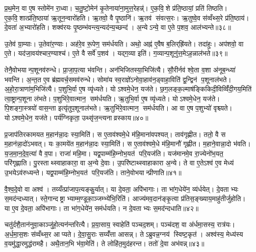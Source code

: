 प्र॒थ॒मेन॒ वा ए॒ष स्तोमे॑न रा॒ध्वा। च॒तु॒ष्टो॒मेन॑ कृ॒तेनाया॑ना॒मुत्त॒रेहन्न्॑। ए॒क॒वि॒शे प्र॑ति॒ष्ठायां॒ प्रति॑ तिष्ठति। ए॒क॒वि॒शात्प्र॑ति॒ष्ठाया॑ ऋ॒तून॒न्वारो॑हति। ऋ॒तवो॒ वै पृ॒ष्ठानि॑। ऋ॒तव॑ संवत्स॒रः। ऋ॒तुष्वे॒व स॑व्वँथ्स॒रे प्र॑ति॒ष्ठाय॑। दे॒वता॑ अ॒भ्यारो॑हति। शक्व॑रयः पृ॒ष्ठम्भ॑वन्त्य॒न्यद॑न्य॒च्छन्द॑। अ॒न्येऽन्ये॒ वा ए॒ते प॒शव॒ आल॑भ्यन्ते॥३८॥

उ॒तेव॑ ग्रा॒म्याः। उ॒तेवा॑र॒ण्याः। अह॑रे॒व रू॒पेण॒ सम॑र्धयति। अथो॒ अह्न॑ ए॒वैष ब॒लिर्‌ह्रि॑यते। तदा॑हुः। अप॑शवो॒ वा ए॒ते। यद॑जा॒वय॑श्चार॒ण्याश्च॑। ए॒ते वै सर्वे॑ प॒शव॑। यद्ग॒व्या इति॑। ग॒व्यान्प॒शूनु॑त्त॒मेऽह॒न्नाल॑भते॥३९॥

तेनै॒वोभयान्प॒शूनव॑रुन्धे। प्रा॒जा॒प॒त्या भ॑वन्ति। अन॑भिजितस्या॒भिजि॑त्यै। सौ॒रीर्नव॑ श्वे॒ता व॒शा अ॑नूब॒न्ध्या॑ भवन्ति। अ॒न्त॒त ए॒व ब्र॑ह्मवर्च॒समव॑रुन्धे। सोमा॑य स्व॒राज्ञे॑ऽनोवा॒हाव॑न॒ड्वाहा॒विति॑ द्व॒न्द्विन॑ प॒शूनाल॑भते। अ॒हो॒रा॒त्राणा॑म॒भिजि॑त्यै। प॒शुभि॒र्वा ए॒ष व्यृ॑ध्यते। योऽश्वमे॒धेन॒ यज॑ते। छ॒ग॒लङ्क॒ल्माष॑ङ्किकिदी॒विव्विँ॑दी॒गय॒मिति॑ त्वा॒ष्ट्रान्प॒शूना ल॑भते। प॒शुभि॑रे॒वात्मान॒ सम॑र्धयति। ऋ॒तुभि॒र्वा ए॒ष व्यृ॑ध्यते। योऽश्वमे॒धेन॒ यज॑ते। पि॒शङ्गा॒स्त्रयो॑ वास॒न्ता इत्यृ॑तुप॒शूनाल॑भते। ऋ॒तुभि॑रे॒वात्मान॒ सम॑र्धयति। आ वा ए॒ष प॒शुभ्यो॑ वृश्च्यते। योऽश्वमे॒धेन॒ यज॑ते। पर्य॑ग्निकृता॒ उथ्सृ॑ज॒न्त्यनाव्रस्काय॥४०॥\anuvakamend[ल॒भ्य॒न्ते॒ ल॒भ॒ते॒ त्वा॒ष्ट्रान्प॒शूनाल॑भते॒ऽष्टौ च॑]

प्र॒जाप॑तिरकामयत म॒हान॑न्ना॒दः स्या॒मिति॑। स ए॒ताव॑श्वमे॒धे म॑हि॒माना॑वपश्यत्। ताव॑गृह्णीत। ततो॒ वै स म॒हान॑न्ना॒दो॑ऽभवत्। यः का॒मये॑त म॒हान॑न्ना॒दः स्या॒मिति॑। स ए॒ताव॑श्वमे॒धे म॑हि॒मानौ॑ गृह्णीत। म॒हाने॒वान्ना॒दो भ॑वति। य॒ज॒मा॒न॒दे॒व॒त्या॑ वै व॒पा। राजा॑ महि॒मा। यद्व॒पाम्म॑हि॒म्नोभ॒यत॑ परि॒यज॑ति। यज॑मानमे॒व रा॒ज्येनो॑भ॒यत॒ परि॑गृह्णाति। पु॒रस्ताथ्स्वाहाकारा॒ वा अ॒न्ये दे॒वाः। उ॒परि॑ष्टाथ्स्वाहाकारा अ॒न्ये। ते वा ए॒तेऽश्व॑ ए॒व मेध्य॑ उ॒भयेऽव॑रुध्यन्ते। यद्व॒पाम्म॑हि॒म्नोभ॒यत॑ परि॒यज॑ति। ताने॒वोभयान्प्रीणाति॥४१॥\anuvakamend[प॒रि॒यज॑ति॒ षट्च॑]

वै॒श्व॒दे॒वो वा अश्व॑। तय्यँत्प्रा॑जाप॒त्यङ्कु॒र्यात्। या दे॒वता॒ अपि॑भागाः। ता भा॑ग॒धेये॑न॒ व्य॑र्धयेत्। दे॒वताभ्यः स॒मद॑न्दध्यात्। स्ते॒गान्दष्ट्राभ्याम्म॒ण्डूका॒ञ्जम्भ्ये॑भि॒रिति॑। आज्य॑मव॒दान॑ङ्कृ॒त्वा प्र॑तिस॒ङ्ख्याय॒माहु॑तीर्जुहोति। या ए॒व दे॒वता॒ अपि॑भागाः। ता भा॑ग॒धेये॑न॒ सम॑र्धयति। न दे॒वताभ्यः स॒मद॑न्दधाति॥४२॥

चतु॑र्दशै॒तान॑नुवा॒काञ्जु॑हो॒त्यन॑न्तरित्यै। प्र॒या॒साय॒ स्वाहेति॑ पञ्चद॒शम्। पञ्च॑दश॒ वा अ॑र्धमा॒सस्य॒ रात्र॑यः। अ॒र्ध॒मा॒स॒शः स॑व्वँथ्स॒र आप्यते। दे॒वा॒सु॒राः सय्यँ॑त्ता आसन्न्। तेऽब्रुवन्न॒ग्नय॑ स्विष्ट॒कृत॑। अश्व॑स्य॒ मेध्य॑स्य व॒यमु॑द्धा॒रमुद्ध॑रामहै। अथै॒तान॒भि भ॑वा॒मेति॑। ते लोहि॑त॒मुद॑हरन्त। ततो॑ दे॒वा अभ॑वन्न्॥४३॥

